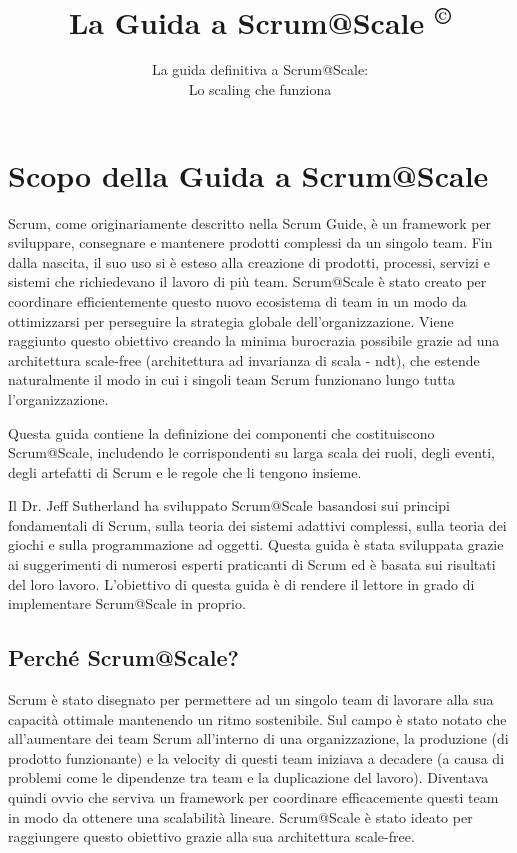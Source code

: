 \documentclass[12pt,a4paper,parskip=full]{scrartcl}
\title{\Huge{\color{red}\textbf{La Guida a Scrum@Scale
\textsuperscript{\copyright}
}}}
\subtitle{\color{gray}La guida definitiva a Scrum@Scale:\\ Lo scaling che funziona}
\date{}
\begin{document}

\section{Scopo della Guida a Scrum@Scale}
Scrum, come originariamente descritto nella Scrum Guide, è un 
framework per sviluppare, consegnare e mantenere prodotti complessi da 
un singolo team. Fin dalla nascita, il suo uso si è esteso alla creazione di 
prodotti, processi, servizi e sistemi che richiedevano il lavoro di più team.
Scrum@Scale è stato creato per coordinare efficientemente questo nuovo 
ecosistema di team in un modo da ottimizzarsi per perseguire la strategia 
globale dell'organizzazione. Viene raggiunto questo obiettivo creando la 
minima burocrazia possibile grazie ad una architettura scale-free (architettura ad invarianza di scala - ndt), che estende naturalmente il modo in cui i singoli 
team Scrum funzionano lungo tutta l'organizzazione.

Questa guida contiene la definizione dei componenti che costituiscono Scrum@Scale, includendo le corrispondenti su larga scala dei ruoli, degli eventi, degli artefatti di Scrum e le regole che li tengono insieme.

Il Dr. Jeff Sutherland ha sviluppato Scrum@Scale basandosi sui principi fondamentali di Scrum, sulla teoria dei sistemi adattivi complessi, sulla teoria dei giochi e sulla programmazione ad oggetti. Questa guida è stata sviluppata grazie ai suggerimenti di numerosi esperti praticanti di Scrum ed è basata sui risultati del loro lavoro. L'obiettivo di questa guida è di rendere il lettore in grado di implementare Scrum@Scale in proprio.

\subsection{Perché Scrum@Scale?}
Scrum è stato disegnato per permettere ad un singolo team di lavorare 
alla sua capacità ottimale mantenendo un ritmo sostenibile. Sul campo è
stato notato che all'aumentare dei team Scrum all'interno di una organizzazione,
la produzione (di prodotto funzionante) e la velocity di questi team iniziava a
decadere (a causa di problemi come le dipendenze tra team e la duplicazione
del lavoro). Diventava quindi ovvio che serviva un framework per coordinare 
efficacemente questi team in modo da ottenere una scalabilità lineare.
Scrum@Scale è stato ideato per raggiungere questo obiettivo grazie alla
sua architettura scale-free.
\end{document}
